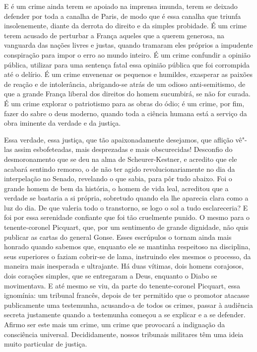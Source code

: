  E é um crime ainda terem se apoiado na imprensa imunda, terem se deixado
defender por toda a canalha de Paris, 
de modo que é essa canalha que triunfa insolenemente, 
diante da derrota do direito e da simples probidade.  É um crime terem acusado de perturbar a 
França aqueles que a querem generosa, na vanguarda das nações livres e justas, quando tramaram
eles próprios a impudente conspiração para impor o erro ao mundo inteiro.  
É um crime confundir a opinião pública, utilizar para uma sentença fatal
essa opinião pública que foi corrompida até o delírio. É um crime
envenenar os pequenos e humildes, exasperar as paixões de reação e de
intolerância, abrigando-se atrás de um odioso anti-semitismo, de que a grande
França liberal dos direitos do homem sucumbirá, se não for curada.
É um crime explorar o patriotismo para as obras do ódio; é um crime, por
fim, fazer do sabre o deus moderno, quando toda a ciência humana está a
serviço da obra iminente da verdade e da justiça.

 Essa verdade, essa justiça, que tão apaixonadamente desejamos, que
aflição vê"-las assim esbofeteadas, mais desprezadas e mais
obscurecidas! Desconfio do desmoronamento que se deu na alma de
Scheurer-Kestner, e acredito que ele acabará sentindo remorso, o de
não ter agido revolucionariamente no dia da interpelação no Senado,
revelando o que sabia, para pôr tudo abaixo. Foi o grande homem de bem
da história, o homem de vida leal, acreditou que a verdade se
bastaria a si própria, sobretudo quando ela lhe aparecia clara como a luz do dia.  
De que valeria todo o transtorno, se logo o sol a tudo esclareceria?
E foi por essa serenidade confiante que foi tão cruelmente punido. O mesmo
para o tenente-coronel Picquart, que, por um sentimento de grande
dignidade, não quis publicar as cartas do general Gonse. Esses
escrúpulos o tornam ainda mais honrado quando sabemos que, enquanto ele
se mantinha respeitoso na disciplina, seus superiores o faziam
cobrir-se de lama, instruindo eles mesmos o processo, da maneira mais
inesperada e ultrajante. Há duas vítimas, dois homens corajosos, dois
corações simples, que se entregaram a Deus, enquanto o Diabo se
movimentava. E até mesmo se viu, da parte do tenente-coronel Picquart, essa
ignomínia: um tribunal francês, depois de ter permitido que o promotor atacasse 
publicamente uma testemunha, acusando-a de todos os
crimes, passar à audiência secreta justamente quando a testemunha começou a se explicar e
a se defender. Afirmo ser este mais um crime, um crime que provocará a indignação
da consciência universal. Decididamente, nossos tribunais
militares têm uma ideia muito particular de justiça.

